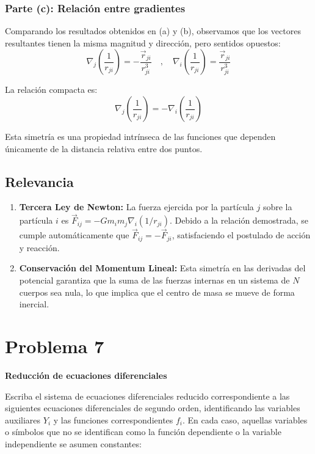 \documentclass[12pt, letterpaper]{article}
\begin{document}
\subsubsection*{Parte (c): Relación entre gradientes}

Comparando los resultados obtenidos en (a) y (b), observamos que los vectores resultantes tienen la misma magnitud y dirección, pero sentidos opuestos:
$$ \nabla_j \left( \frac{1}{r_{ji}} \right) = -\frac{\vec{r}_{ji}}{r_{ji}^3} \quad , \quad \nabla_i \left( \frac{1}{r_{ji}} \right) = \frac{\vec{r}_{ji}}{r_{ji}^3} $$

La relación compacta es:
$$ \nabla_j \left( \frac{1}{r_{ji}} \right) = -\nabla_i \left( \frac{1}{r_{ji}} \right) $$

Esta simetría es una propiedad intrínseca de las funciones que dependen únicamente de la distancia relativa entre dos puntos.

\subsection{Relevancia}

\begin{enumerate}
    \item \textbf{Tercera Ley de Newton:} La fuerza ejercida por la partícula $j$ sobre la partícula $i$ es $\vec{F}_{ij} = -G m_i m_j \nabla_i (1/r_{ji})$. Debido a la relación demostrada, se cumple automáticamente que $\vec{F}_{ij} = -\vec{F}_{ji}$, satisfaciendo el postulado de acción y reacción.
    \item \textbf{Conservación del Momentum Lineal:} Esta simetría en las derivadas del potencial garantiza que la suma de las fuerzas internas en un sistema de $N$ cuerpos sea nula, lo que implica que el centro de masa se mueve de forma inercial.
\end{enumerate}



\section{Problema 7}

\textbf{Reducción de ecuaciones diferenciales}

Escriba el sistema de ecuaciones diferenciales reducido correspondiente a las siguientes ecuaciones diferenciales de segundo orden, identificando las variables auxiliares $Y_i$ y las funciones correspondientes $f_i$. En cada caso, aquellas variables o símbolos que no se identifican como la función dependiente o la variable independiente se asumen constantes:
\end{document}
